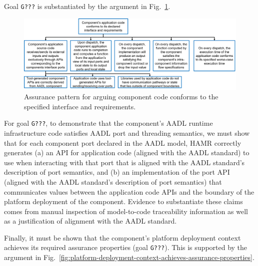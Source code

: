 Goal \texttt{G???} is substantiated by the argument in Fig.~\ref{fig:code-conforms-to-interface-and-requirements}.

\begin{figure}[h]
	\centering 
	\includegraphics[width=\textwidth]{figs/code-conforms-to-interface-and-requirements.png}
	\caption{Assurance pattern for arguing component code conforms to the specified interface and requirements.}
	\label{fig:code-conforms-to-interface-and-requirements} 
\end{figure}

For goal \texttt{G???}, to demonstrate that the component's AADL runtime infrastructure code satisfies AADL port and threading semantics, we must show that for each component port declared in the AADL model, HAMR correctly generates (a) an API for application code (aligned with the AADL standard) to use when interacting with that port that is aligned with the AADL standard's description of port semantics, and (b) an implementation of the port API (aligned with the AADL standard's description of port semantics) that communicates values between the application code APIs and the boundary of the platform deployment of the component.  
Evidence to substantiate these claims comes from manual inspection of model-to-code traceability information as well as a justification of alignment with the AADL standard.

Finally, it must be shown that the component's platform deployment context achieves its required assurance properties (goal \texttt{G???}).  This is supported by the argument in Fig.~\ref{fig:platform-deployment-context-achieves-assurance-properties}.

